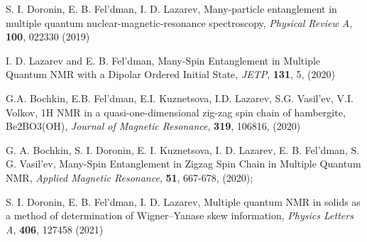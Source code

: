 \item S. I. Doronin, E. B. Fel'dman,  I. D. Lazarev, Many-particle entanglement in multiple quantum nuclear-magnetic-resonance spectroscopy, \textit{Physical Review A}, \textbf{100}, 022330 (2019)
\item I. D. Lazarev and E. B. Fel'dman, Many-Spin Entanglement in Multiple Quantum NMR with a Dipolar Ordered Initial State,  \textit{JETP}, \textbf{131}, 5, (2020)
\item G.A. Bochkin, E.B. Fel'dman, E.I. Kuznetsova, I.D. Lazarev, S.G. Vasil'ev, V.I. Volkov, 1H NMR in a quasi-one-dimensional zig-zag spin chain of hambergite, Be2BO3(OH), \textit{Journal of Magnetic Resonance}, \textbf{319}, 106816, (2020)
\item G. A. Bochkin, S. I. Doronin, E. I. Kuznetsova, I. D. Lazarev, E. B. Fel'dman, S. G. Vasil'ev, Many-Spin Entanglement in Zigzag Spin Chain in Multiple Quantum NMR, \textit{Applied Magnetic Resonance}, \textbf{51}, 667-678, (2020);
\item S. I. Doronin, E. B. Fel'dman,  I. D. Lazarev, Multiple quantum NMR in solids as a method of determination of Wigner–Yanase skew information, \textit{Physics Letters A}, \textbf{406}, 127458 (2021)